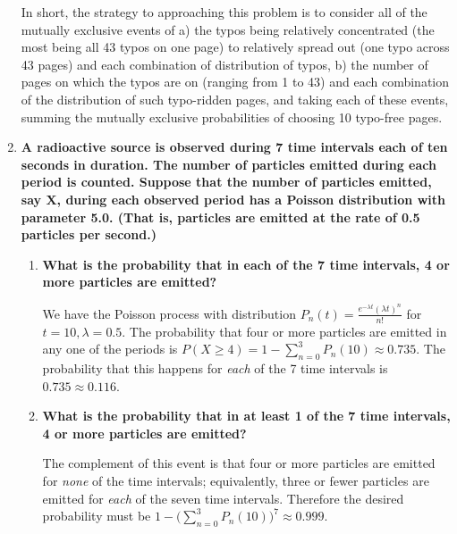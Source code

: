 \documentclass[10pt, oneside]{article}   	%
\theoremstyle{definition}
\begin{document}
\begin{enumerate}[label=8.\arabic*]
In short, the strategy to approaching this problem is to consider all of the mutually exclusive events of a) the typos being relatively concentrated (the most being all 43 typos on one page) to relatively spread out (one typo across 43 pages) and each combination of distribution of typos, b) the number of pages on which the typos are on (ranging from 1 to 43) and each combination of the distribution of such typo-ridden pages, and taking each of these events, summing the mutually exclusive probabilities of choosing 10 typo-free pages.

\item  \begin{tcolorbox}[
  colback=Cerulean!5!white,
  colframe=Cerulean!75!black]
\textbf{A radioactive source is observed during 7 time intervals each of ten seconds in duration. The number of particles emitted during each period is counted. Suppose that the number of particles emitted, say $\bm{X}$, during each observed period has a Poisson distribution with parameter 5.0. (That is, particles are emitted at the rate of 0.5 particles per second.)}
\end{tcolorbox}

	\begin{enumerate}
	\item  \begin{tcolorbox}[
	  colback=Cerulean!5!white,
	  colframe=Cerulean!75!black]
	\textbf{What is the probability that in each of the 7 time intervals, 4 or more particles are emitted?}
	\end{tcolorbox}
	
	We have the Poisson process with distribution $P_n (t) = \frac{e^{-\lambda t} (\lambda t)^n}{n!}$ for $t = 10, \lambda = 0.5$. The probability that four or more particles are emitted in any one of the periods is $P(X \geq 4) = 1 - \sum^3_{n = 0} P_n (10) \approx 0.735$. The probability that this happens for \textit{each} of the 7 time intervals is $0.735 \approx \boxed{0.116}$.
	
	\item  \begin{tcolorbox}[
	  colback=Cerulean!5!white,
	  colframe=Cerulean!75!black]
	\textbf{What is the probability that in at least 1 of the 7 time intervals, 4 or more particles are emitted?}
	\end{tcolorbox}
	
	The complement of this event is that four or more particles are emitted for \textit{none} of the time intervals; equivalently, three or fewer particles are emitted for \textit{each} of the seven time intervals. Therefore the desired probability must be $1 - \Big( \sum^3_{n=0} P_n (10) \Big)^7 \approx \boxed{0.999}$.
	\end{enumerate}


\end{enumerate}
\end{document}
